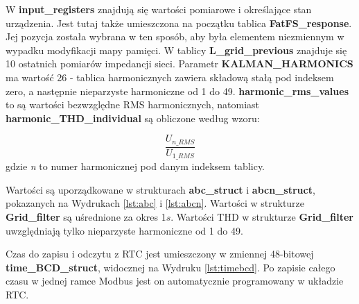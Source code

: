 \documentclass[12pt,a4paper]{article}
\begin{document}
W \textbf{input\_registers} znajdują się wartości pomiarowe i określające stan urządzenia. Jest tutaj także umieszczona na początku tablica \textbf{FatFS\_response}. Jej pozycja została wybrana w ten sposób, aby była elementem niezmiennym w wypadku modyfikacji mapy pamięci. W tablicy \textbf{L\_grid\_previous} znajduje się 10 ostatnich pomiarów impedancji sieci. Parametr \textbf{KALMAN\_HARMONICS} ma wartość 26 - tablica harmonicznych zawiera składową stałą pod indeksem zero, a następnie nieparzyste harmoniczne od 1 do 49. \textbf{harmonic\_rms\_values} to są wartości bezwzględne RMS harmonicznych, natomiast \textbf{harmonic\_THD\_individual} są obliczone według wzoru:

$$\frac{U_{n\_RMS}}{U_{1\_RMS}}$$
gdzie \textit{n} to numer harmonicznej pod danym indeksem tablicy.

Wartości są uporządkowane w strukturach \textbf{abc\_struct} i \textbf{abcn\_struct}, pokazanych na Wydrukach \ref{lst:abc} i \ref{lst:abcn}. Wartości w strukturze \textbf{Grid\_filter} są uśrednione za okres 1$s$. Wartości THD w strukturze \textbf{Grid\_filter} uwzględniają tylko nieparzyste harmoniczne od 1 do 49.

Czas do zapisu i odczytu z RTC jest umieszczony w zmiennej 48-bitowej \textbf{time\_BCD\_struct}, widocznej na Wydruku \ref{lst:timebcd}. Po zapisie całego czasu w jednej ramce Modbus jest on automatycznie programowany w układzie RTC.










\end{document}
